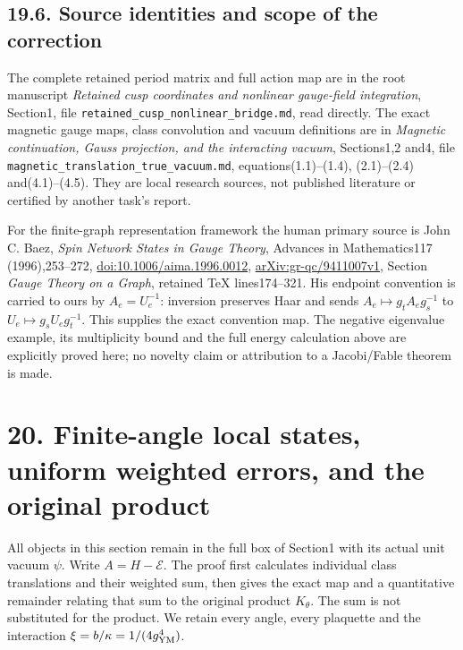 \documentclass[
]{article}
\begin{document}
\subsection{19.6. Source identities and scope of the
correction}\label{source-identities-and-scope-of-the-correction}

The complete retained period matrix and full action map are in the root
manuscript \emph{Retained cusp coordinates and nonlinear gauge-field
integration}, Section1, file
\texttt{retained\_cusp\_nonlinear\_bridge.md}, read directly. The exact
magnetic gauge maps, class convolution and vacuum definitions are in
\emph{Magnetic continuation, Gauss projection, and the interacting
vacuum}, Sections1,2 and4, file
\texttt{magnetic\_translation\_true\_vacuum.md}, equations(1.1)--(1.4),
(2.1)--(2.4) and(4.1)--(4.5). They are local research sources, not
published literature or certified by another task's report.

For the finite-graph representation framework the human primary source
is John C. Baez, \emph{Spin Network States in Gauge Theory}, Advances in
Mathematics117 (1996),253--272,
\href{https://doi.org/10.1006/aima.1996.0012}{doi:10.1006/aima.1996.0012},
\href{https://arxiv.org/abs/gr-qc/9411007v1}{arXiv:gr-qc/9411007v1},
Section \emph{Gauge Theory on a Graph}, retained TeX lines174--321. His
endpoint convention is carried to ours by \(A_e=U_e^{-1}\): inversion
preserves Haar and sends \(A_e\mapsto g_tA_eg_s^{-1}\) to
\(U_e\mapsto g_sU_eg_t^{-1}\). This supplies the exact convention map.
The negative eigenvalue example, its multiplicity bound and the full
energy calculation above are explicitly proved here; no novelty claim or
attribution to a Jacobi/Fable theorem is made.

\section{20. Finite-angle local states, uniform weighted errors, and the
original
product}\label{finite-angle-local-states-uniform-weighted-errors-and-the-original-product}

All objects in this section remain in the full box of Section1 with its
actual unit vacuum \(\psi\). Write \(A=H-\mathcal E\). The proof first
calculates individual class translations and their weighted sum, then
gives the exact map and a quantitative remainder relating that sum to
the original product \(K_\theta\). The sum is not substituted for the
product. We retain every angle, every plaquette and the interaction
\(\xi=b/\kappa=1/(4g_{\rm YM}^4)\).
\end{document}
